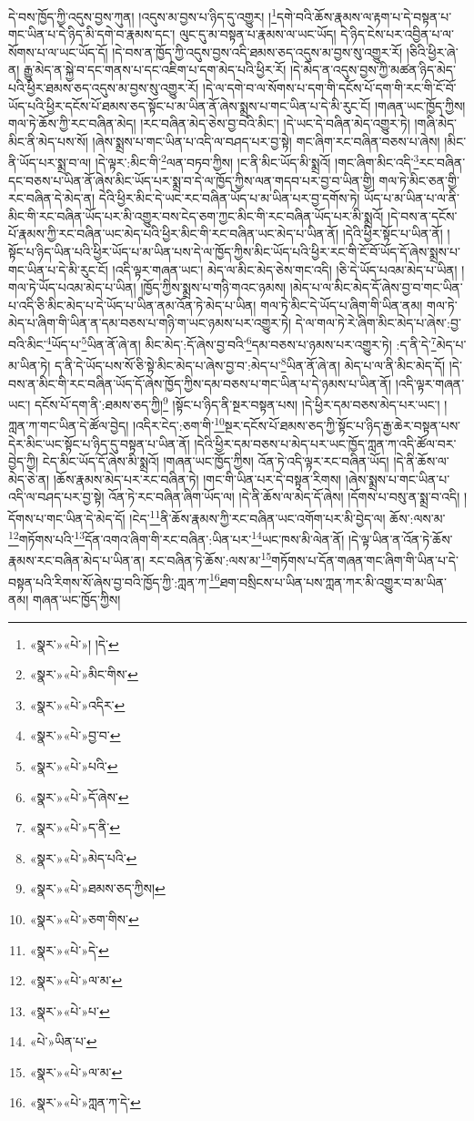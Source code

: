 དེ་བས་ཁྱོད་ཀྱི་འདུས་བྱས་ཀུན། །འདུས་མ་བྱས་པ་ཉིད་དུ་འགྱུར། །\footnote{«སྣར་»«པེ་»། །དེ་}དགེ་བའི་ཆོས་རྣམས་ལ་རྟག་པ་དེ་བསྟན་པ་གང་ཡིན་པ་དེ་ཉིད་མི་དགེ་བ་རྣམས་དང་། ལུང་དུ་མ་བསྟན་པ་རྣམས་ལ་ཡང་ཡོད། དེ་ཉིད་ངེས་པར་འབྱིན་པ་ལ་སོགས་པ་ལ་ཡང་ཡོད་དོ། །དེ་བས་ན་ཁྱོད་ཀྱི་འདུས་བྱས་འདི་ཐམས་ཅད་འདུས་མ་བྱས་སུ་འགྱུར་རོ། །ཅིའི་ཕྱིར་ཞེ་ན། རྒྱུ་མེད་ན་སྐྱེ་བ་དང་གནས་པ་དང་འཇིག་པ་དག་མེད་པའི་ཕྱིར་རོ། །དེ་མེད་ན་འདུས་བྱས་ཀྱི་མཚན་ཉིད་མེད་པའི་ཕྱིར་ཐམས་ཅད་འདུས་མ་བྱས་སུ་འགྱུར་རོ། །དེ་ལ་དགེ་བ་ལ་སོགས་པ་དག་གི་དངོས་པོ་དག་གི་རང་གི་ངོ་བོ་ཡོད་པའི་ཕྱིར་དངོས་པོ་ཐམས་ཅད་སྟོང་པ་མ་ཡིན་ནོ་ཞེས་སྨྲས་པ་གང་ཡིན་པ་དེ་མི་རུང་ངོ། །གཞན་ཡང་ཁྱོད་ཀྱིས། གལ་ཏེ་ཆོས་ཀྱི་རང་བཞིན་མེད། །རང་བཞིན་མེད་ཅེས་བྱ་བའི་མིང་། །དེ་ཡང་དེ་བཞིན་མེད་འགྱུར་ཏེ། །གཞི་མེད་མིང་ནི་མེད་པས་སོ། །ཞེས་སྨྲས་པ་གང་ཡིན་པ་འདི་ལ་བཤད་པར་བྱ་སྟེ། གང་ཞིག་རང་བཞིན་བཅས་པ་ཞེས། །མིང་ནི་ཡོད་པར་སྨྲ་བ་ལ། །དེ་ལྟར་:མིང་གི་\footnote{«སྣར་»«པེ་»མིང་གིས་}ལན་བཏབ་ཀྱིས། །ང་ནི་མིང་ཡོད་མི་སྨྲའོ། །གང་ཞིག་མིང་འདི་\footnote{«སྣར་»«པེ་»འདིར་}རང་བཞིན་དང་བཅས་པ་ཡིན་ནོ་ཞེས་མིང་ཡོད་པར་སྨྲ་བ་དེ་ལ་ཁྱོད་ཀྱིས་ལན་གདབ་པར་བྱ་བ་ཡིན་གྱི། གལ་ཏེ་མིང་ཅན་གྱི་རང་བཞིན་དེ་མེད་ན། དེའི་ཕྱིར་མིང་དེ་ཡང་རང་བཞིན་ཡོད་པ་མ་ཡིན་པར་བྱ་དགོས་ཏེ། ཡོད་པ་མ་ཡིན་པ་ལ་ནི་མིང་གི་རང་བཞིན་ཡོད་པར་མི་འགྱུར་བས་ངེད་ཅག་ཀྱང་མིང་གི་རང་བཞིན་ཡོད་པར་མི་སྨྲའོ། །དེ་བས་ན་དངོས་པོ་རྣམས་ཀྱི་རང་བཞིན་ཡང་མེད་པའི་ཕྱིར་མིང་གི་རང་བཞིན་ཡང་མེད་པ་ཡིན་ནོ། །དེའི་ཕྱིར་སྟོང་པ་ཡིན་ནོ། །སྟོང་པ་ཉིད་ཡིན་པའི་ཕྱིར་ཡོད་པ་མ་ཡིན་པས་དེ་ལ་ཁྱོད་ཀྱིས་མིང་ཡོད་པའི་ཕྱིར་རང་གི་ངོ་བོ་ཡོད་དོ་ཞེས་སྨྲས་པ་གང་ཡིན་པ་དེ་མི་རུང་ངོ། །འདི་ལྟར་གཞན་ཡང་། མེད་ལ་མིང་མེད་ཅེས་གང་འདི། །ཅི་དེ་ཡོད་པའམ་མེད་པ་ཡིན། །གལ་ཏེ་ཡོད་པའམ་མེད་པ་ཡིན། །ཁྱོད་ཀྱིས་སྨྲས་པ་གཉི་གའང་ཉམས། །མེད་པ་ལ་མིང་མེད་དོ་ཞེས་བྱ་བ་གང་ཡིན་པ་འདི་ཅི་མིང་མེད་པ་དེ་ཡོད་པ་ཡིན་ནམ་འོན་ཏེ་མེད་པ་ཡིན། གལ་ཏེ་མིང་དེ་ཡོད་པ་ཞིག་གི་ཡིན་ནམ། གལ་ཏེ་མེད་པ་ཞིག་གི་ཡིན་ན་དམ་བཅས་པ་གཉི་ག་ཡང་ཉམས་པར་འགྱུར་ཏེ། དེ་ལ་གལ་ཏེ་རེ་ཞིག་མིང་མེད་པ་ཞེས་:བྱ་བའི་མིང་\footnote{«སྣར་»«པེ་»བྱ་བ་}ཡོད་པ་\footnote{«སྣར་»«པེ་»པའི་}ཡིན་ནོ་ཞེ་ན། མིང་མེད་:དོ་ཞེས་བྱ་བའི་\footnote{«སྣར་»«པེ་»དོ་ཞེས་}དམ་བཅས་པ་ཉམས་པར་འགྱུར་ཏེ། :ད་ནི་དེ་\footnote{«སྣར་»«པེ་»ད་ནི་}མེད་པ་མ་ཡིན་ཏེ། ད་ནི་དེ་ཡོད་པས་སོ་ཅི་སྟེ་མིང་མེད་པ་ཞེས་བྱ་བ་:མེད་པ་\footnote{«སྣར་»«པེ་»མེད་པའི་}ཡིན་ནོ་ཞེ་ན། མེད་པ་ལ་ནི་མིང་མེད་དོ། །དེ་བས་ན་མིང་གི་རང་བཞིན་ཡོད་དོ་ཞེས་ཁྱོད་ཀྱིས་དམ་བཅས་པ་གང་ཡིན་པ་དེ་ཉམས་པ་ཡིན་ནོ། །འདི་ལྟར་གཞན་ཡང་། དངོས་པོ་དག་ནི་:ཐམས་ཅད་ཀྱི།\footnote{«སྣར་»«པེ་»ཐམས་ཅད་ཀྱིས།} །སྟོང་པ་ཉིད་ནི་སྔར་བསྟན་པས། །དེ་ཕྱིར་དམ་བཅས་མེད་པར་ཡང་། །ཀླན་ཀ་གང་ཡིན་དེ་ཚོལ་བྱེད། །འདིར་ངེད་:ཅག་གི་\footnote{«སྣར་»«པེ་»ཅག་གིས་}སྔར་དངོས་པོ་ཐམས་ཅད་ཀྱི་སྟོང་པ་ཉིད་རྒྱ་ཆེར་བསྟན་པས་དེར་མིང་ཡང་སྟོང་པ་ཉིད་དུ་བསྟན་པ་ཡིན་ནོ། །དེའི་ཕྱིར་དམ་བཅས་པ་མེད་པར་ཡང་ཁྱོད་ཀླན་ཀ་འདི་ཚོལ་བར་བྱེད་ཀྱི། ངེད་མིང་ཡོད་དོ་ཞེས་མི་སྨྲའོ། །གཞན་ཡང་ཁྱོད་ཀྱིས། འོན་ཏེ་འདི་ལྟར་རང་བཞིན་ཡོད། །དེ་ནི་ཆོས་ལ་མེད་ཅེ་ན། །ཆོས་རྣམས་མེད་པར་རང་བཞིན་ཏེ། །གང་གི་ཡིན་པར་དེ་བསྟན་རིགས། །ཞེས་སྨྲས་པ་གང་ཡིན་པ་འདི་ལ་བཤད་པར་བྱ་སྟེ། འོན་ཏེ་རང་བཞིན་ཞིག་ཡོད་ལ། །དེ་ནི་ཆོས་ལ་མེད་དོ་ཞེས། །དོགས་པ་བསུ་ན་སྨྲ་བ་འདི། །དོགས་པ་གང་ཡིན་དེ་མེད་དོ། །ངེད་\footnote{«སྣར་»«པེ་»དེ་}ནི་ཆོས་རྣམས་ཀྱི་རང་བཞིན་ཡང་འགོག་པར་མི་བྱེད་ལ། ཆོས་:ལས་མ་\footnote{«སྣར་»«པེ་»ལ་མ་}གཏོགས་པའི་\footnote{«སྣར་»«པེ་»པ་}དོན་འགའ་ཞིག་གི་རང་བཞིན་:ཡིན་པར་\footnote{«པེ་»ཡིན་པ་}ཡང་ཁས་མི་ལེན་ནོ། །དེ་ལྟ་ཡིན་ན་འོན་ཏེ་ཆོས་རྣམས་རང་བཞིན་མེད་པ་ཡིན་ན། རང་བཞིན་ཏེ་ཆོས་:ལས་མ་\footnote{«སྣར་»«པེ་»ལ་མ་}གཏོགས་པ་དོན་གཞན་གང་ཞིག་གི་ཡིན་པ་དེ་བསྟན་པའི་རིགས་སོ་ཞེས་བྱ་བའི་ཁྱོད་ཀྱི་:ཀླན་ཀ་\footnote{«སྣར་»«པེ་»ཀླན་ཀ་དེ་}ཐག་བསྲིངས་པ་ཡིན་པས་ཀླན་ཀར་མི་འགྱུར་བ་མ་ཡིན་ནམ། གཞན་ཡང་ཁྱོད་ཀྱིས། 